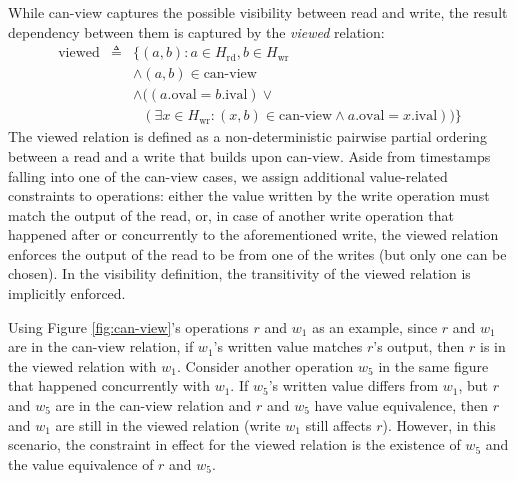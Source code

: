   While can-view captures the possible visibility between read and write, the
  result dependency between them is captured by the \textit{viewed} relation:
  \begin{eqnarray*}
    \text{viewed} & \triangleq & \{(a, b) : a \in H_\text{rd}, b \in
      H_\text{wr} \\
      & & \land (a, b) \in \text{can-view} \\
      & & \land (
        (a.\text{oval} = b.\text{ival})\lor \\
        & &
        \text{ }(\exists x \in H_\text{wr} : (x, b) \in
        \text{can-view} \land a.\text{oval} = x.\text{ival})
      )
    \}
  \end{eqnarray*}
  The viewed relation is defined as a non-deterministic
  pairwise partial ordering
  between a read and a write that builds upon can-view. Aside from timestamps
  falling into one of the can-view cases, we
  assign additional value-related constraints to operations: either the value
  written by the write operation must match the output
  of the read, or, in case of another write operation that happened after or
  concurrently to the aforementioned write, the viewed relation enforces the
  output of the read to be from one of the writes (but only one can be chosen).
  In the visibility definition, the transitivity of the viewed relation
  is implicitly
  enforced.

  Using Figure \ref{fig:can-view}'s operations $r$ and $w_1$ as an example,
  since $r$ and $w_1$ are in the can-view relation, if $w_1$'s written
  value matches $r$'s output, then $r$ is in the viewed relation with $w_1$.
  Consider another operation $w_5$ in the same figure that happened
  concurrently with $w_1$. If $w_5$'s written value differs
  from $w_1$, but $r$ and $w_5$ are in the can-view relation and $r$ and
  $w_5$ have value equivalence, then $r$ and $w_1$ are still in the viewed
  relation (write $w_1$ still affects $r$).
  However, in this scenario, the constraint in effect for the viewed
  relation is the existence of $w_5$ and the value equivalence of $r$ and $w_5$.

